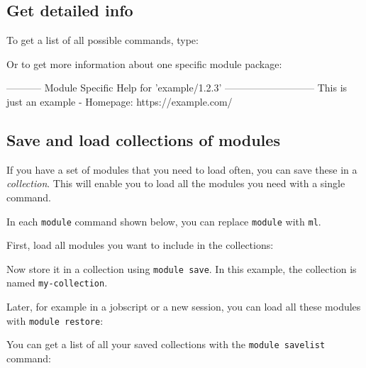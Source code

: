 \fi
\subsection{Get detailed info}

To get a list of all possible commands, type:

\begin{prompt}
\end{prompt}

Or to get more information about one specific module package:

\begin{prompt}
----------- Module Specific Help for 'example/1.2.3' ---------------------------
  This is just an example - Homepage: https://example.com/
\end{prompt}

\ifusinglmod
\subsection{Save and load collections of modules}
If you have a set of modules that you need to load often,
you can save these in a \emph{collection}. This will enable you to load all the
modules you need with a single command.

In each \lstinline|module| command shown below, you can replace \lstinline|module| with
\lstinline|ml|.

First, load all modules you want to include in the collections:

\begin{prompt}
\end{prompt}

Now store it in a collection using \lstinline|module save|. In this example, the collection
is named \lstinline|my-collection|.

\begin{prompt}
\end{prompt}

Later, for example in a jobscript or a new session, you can load all these modules with
\lstinline|module restore|:

\begin{prompt}
\end{prompt}

You can get a list of all your saved collections with the \lstinline|module savelist|
command:

